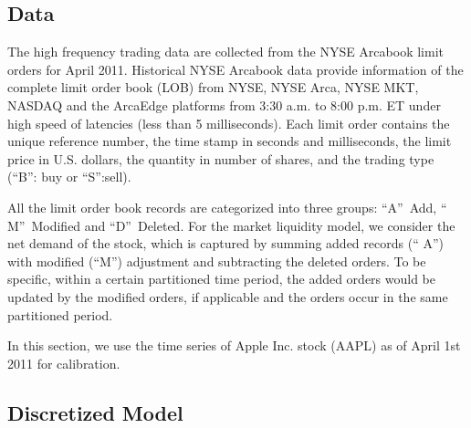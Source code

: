 \documentclass{article}
\begin{document}
\subsection{Data}

The high frequency trading data are collected from the NYSE Arcabook limit
orders for April 2011. Historical NYSE Arcabook data provide information of
the complete limit order book (LOB) from NYSE, NYSE Arca, NYSE MKT, NASDAQ
and the ArcaEdge platforms from 3:30 a.m. to 8:00 p.m. ET under high speed
of latencies (less than 5 milliseconds). Each limit order contains the
unique reference number, the time stamp in seconds and milliseconds, the
limit price in U.S. dollars, the quantity in number of shares, and the
trading type (\textquotedblleft B\textquotedblright : buy or
\textquotedblleft S\textquotedblright :sell).

All the limit order book records are categorized into three groups:
\textquotedblleft A\textquotedblright\ Add, \textquotedblleft
M\textquotedblright\ Modified and \textquotedblleft D\textquotedblright\
Deleted. For the market liquidity model, we consider the net demand of the
stock, which is captured by summing added records (\textquotedblleft
A\textquotedblright ) with modified (\textquotedblleft M\textquotedblright )
adjustment and subtracting the deleted orders. To be specific, within a
certain partitioned time period, the added orders would be updated by the
modified orders, if applicable and the orders occur in the same partitioned
period.

In this section, we use the time series of Apple Inc. stock (AAPL) as of
April 1st 2011 for calibration.

\bigskip

\subsection{Discretized Model}
\end{document}

